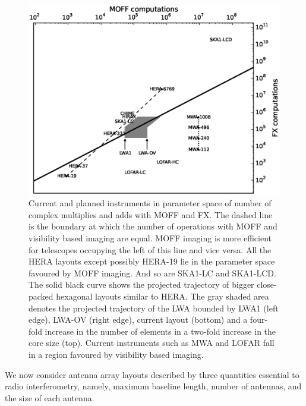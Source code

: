\documentclass[a4paper,fleqn,usenatbib]{../mnras}
\begin{document}
\begin{figure}
  \includegraphics[width=\columnwidth]{MOFF_FX_computations_fov_gridding_annotated.eps}
  \caption{Current and planned instruments in parameter space of
    number of complex multiplies and adds with MOFF and FX. The dashed line
    is the boundary at which the number of operations with MOFF and visibility 
    based imaging are equal. MOFF imaging is more efficient for telescopes 
    occupying the left of this line and vice versa. All the HERA layouts except
    possibly HERA-19 lie in the parameter space favoured by MOFF imaging. And so 
    are SKA1-LC and SKA1-LCD. The solid black curve shows the projected 
    trajectory of bigger close-packed hexagonal layouts similar to HERA. The 
    gray shaded area denotes the projected trajectory of the LWA bounded by LWA1 
    (left edge), LWA-OV (right edge), current layout (bottom) and a four-fold 
    increase in the number of elements in a two-fold increase in the core size
    (top). Current instruments such as MWA and LOFAR fall in a region favoured 
    by visibility based imaging.}
  \label{fig:parameter-space-computations-instruments}
\end{figure}

We now consider antenna array layouts described by three quantities essential
to radio interferometry, namely, maximum baseline length, number of antennas,
and the size of each antenna. 
\end{document}
